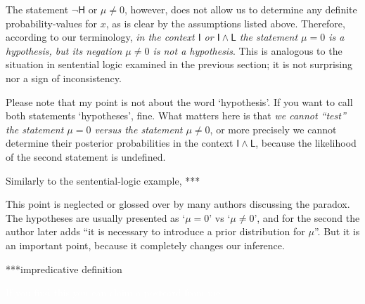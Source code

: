 \documentclass[\ifafour a4paper,12pt,\else a5paper,10pt,\fi%
onecolumn,oneside,article,%
british%
]{memoir}
\makeatletter
\newcommand*{\defquote}[1]{`#1'}
\theoremstyle{remark}
\theoremstyle{innote}
\def\sum{\DOTSI\sumop\slimits@}
\newcommand*{\de}{\partialup}%
\newcommand*{\p}{\mathrm{P}}%
\renewcommand*{\|}[1][]{\nonscript\,#1\vert\nonscript\;\mathopen{}}
\newcommand*{\tsum}{\mathop{\textstyle\sum}\nolimits}
\newcommand*{\yH}{\mathsf{H}}
\newcommand*{\yA}{\mathsf{A}}
\newcommand*{\yI}{\mathsf{I}}
\newcommand*{\yL}{\mathsf{L}}
\makeatother
\begin{document}
\smallskip

The statement $\lnot\yH$ or $\mu \ne 0$, however, does not allow us to
determine any definite probability-values for $x$, as is clear by the
assumptions listed above. Therefore, according to our terminology, \emph{in
  the context $\yI$ or $\yI \land \yL$ the statement $\mu = 0$ is a
  hypothesis, but its negation $\mu \ne 0$ is not a hypothesis}. This is
analogous to the situation in sentential logic examined in the previous
section; it is not surprising nor a sign of inconsistency.

Please note that my point is not about the word \defquote{hypothesis}. If
you want to call both statements \defquote{hypotheses}, fine. What matters
here is that \emph{we cannot \enquote{test} the statement $\mu = 0$ versus
  the statement $\mu \ne 0$}, or more precisely we cannot determine their
posterior probabilities in the context $\yI \land \yL$, because the
likelihood of the second statement is undefined.

Similarly to the sentential-logic example, ***

This point is neglected or glossed over by many authors discussing the
paradox. The hypotheses are usually presented as \defquote{$\mu = 0$} vs
\defquote{$\mu \ne 0$}, and for the second the author later adds
\enquote{it is necessary to introduce a prior distribution for $\mu$}. But
it is an important point, because it completely changes our inference.


***impredicative definition


\textcolor{white}{If you find this you can claim a postcard from me.}


\end{document}
